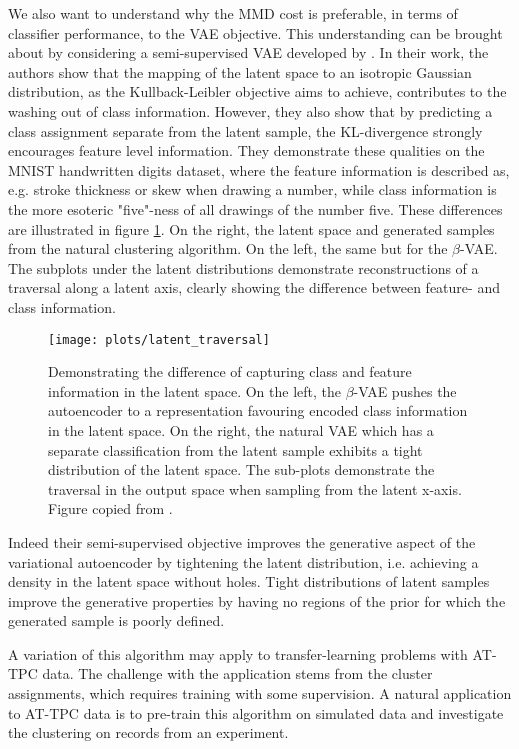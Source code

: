 We also want to understand why the MMD cost is preferable, in terms of classifier performance, to the VAE objective. This understanding can be brought about by considering a semi-supervised VAE developed by \citet{Antoran2019}. In their work, the authors show that the mapping of the latent space to an isotropic Gaussian distribution, as the Kullback-Leibler objective aims to achieve, contributes to the washing out of class information. However, they also show that by predicting a class assignment separate from the latent sample, the KL-divergence strongly encourages feature level information. They demonstrate these qualities on the MNIST handwritten digits dataset, where the feature information is described as, e.g. stroke thickness or skew when drawing a number, while class information is the more esoteric "five"-ness of all drawings of the number five. These differences are illustrated in figure \ref{fig:latent_traversal}. On the right, the latent space and generated samples from the natural clustering algorithm. On the left, the same but for the $\beta$-VAE. The subplots under the latent distributions demonstrate reconstructions of a traversal along a latent axis, clearly showing the difference between feature- and class information. 



\begin{figure}
\centering
\texttt{[image: plots/latent\_traversal]}
\caption[Difference between generative and discriminative latent spaces]{Demonstrating the difference of capturing class and feature information in the latent space. On the left, the $\beta$-VAE pushes the autoencoder to a representation favouring encoded class information in the latent space. On the right, the natural VAE which has a separate classification from the latent sample exhibits a tight distribution of the latent space. The sub-plots demonstrate the traversal in the output space when sampling from the latent x-axis. Figure copied from \citet{Antoran2019}.}\label{fig:latent_traversal}
\end{figure}

Indeed their semi-supervised objective improves the generative aspect of the variational autoencoder by tightening the latent distribution, i.e. achieving a density in the latent space without holes. Tight distributions of latent samples improve the generative properties by having no regions of the prior for which the generated sample is poorly defined. 

A variation of this algorithm may apply to transfer-learning problems with AT-TPC data. The challenge with the application stems from the cluster assignments, which requires training with some supervision. A natural application to AT-TPC data is to pre-train this algorithm on simulated data and investigate the clustering on records from an experiment. 

